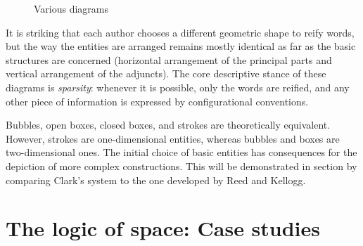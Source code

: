 \documentclass[english,output=paper,colorlinks,citecolor=brown]{../langscibook}
\begin{document}
\begin{figure}
\caption{Various diagrams\label{fig:4:4}}
 \end{figure}

It is striking that each author chooses a different geometric shape to reify words, but the way the entities are arranged remains mostly identical as far as the basic structures are concerned (horizontal arrangement of the principal parts and vertical arrangement of the adjuncts). The core descriptive stance of these diagrams is \textit{sparsity}: whenever it is possible, only the words are reified, and any other piece of information is expressed by configurational conventions.

Bubbles, open boxes, closed boxes, and strokes are theoretically equivalent. However, strokes are one-dimensional entities, whereas bubbles and boxes are two-dimensional ones. The initial choice of basic entities has consequences for the depiction of more complex constructions. This will be demonstrated in section  by comparing Clark’s system to the one developed by Reed and Kellogg.

\section{The logic of space: Case studies}\label{sec:4:4}
\end{document}
